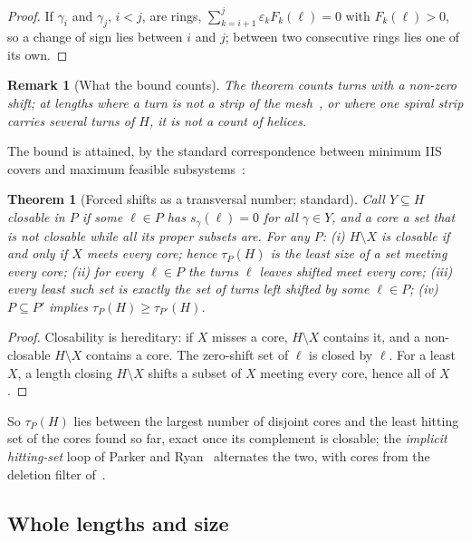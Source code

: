 \documentclass[11pt,a4paper]{article}
\newtheorem{theorem}{Theorem}
\newtheorem{remark}{Remark}
\newcommand{\shift}{s}
\begin{document}
\begin{proof}
If $\gamma_i$ and $\gamma_j$, $i < j$, are rings, $\sum_{k=i+1}^{j}
\varepsilon_k F_k(\ell) = 0$ with $F_k(\ell) > 0$, so a change of sign lies
between $i$ and $j$; between two consecutive rings lies one of its own.
\end{proof}

\begin{remark}[What the bound counts]
The theorem counts turns with a non-zero shift; at lengths where a turn is not
a strip of the mesh~\cite[Prop.~2]{gardent2026loops}, or where one spiral
strip carries several turns of $H$, it is not a count of helices.
\end{remark}

The bound is attained, by the standard correspondence between minimum IIS
covers and maximum feasible subsystems~\cite{amaldi2003maxfs,parker1996iis}:

\begin{theorem}[Forced shifts as a transversal number; standard]\label{thm:transversal}
Call $Y \subseteq H$ \emph{closable} in $P$ if some $\ell \in P$ has
$\shift_\gamma(\ell) = 0$ for all $\gamma \in Y$, and a \emph{core} a set that
is not closable while all its proper subsets are. For any $P$:
(i) $H \setminus X$ is closable if and only if $X$ meets every core; hence
$\tau_P(H)$ is the least size of a set meeting every core;
(ii) for every $\ell \in P$ the turns $\ell$ leaves shifted meet every core;
(iii) every least such set is exactly the set of turns left shifted by some
$\ell \in P$;
(iv) $P \subseteq P'$ implies $\tau_P(H) \ge \tau_{P'}(H)$.
\end{theorem}

\begin{proof}
Closability is hereditary: if $X$ misses a core, $H \setminus X$ contains it,
and a non-closable $H \setminus X$ contains a core. The zero-shift set of
$\ell$ is closed by $\ell$. For a least $X$, a length closing $H \setminus X$
shifts a subset of $X$ meeting every core, hence all of $X$.
\end{proof}

So $\tau_P(H)$ lies between the largest number of disjoint cores and the
least hitting set of the cores found so far, exact once its complement is
closable; the \emph{implicit hitting-set} loop of Parker and
Ryan~\cite{parker1996iis} alternates the two, with
cores from the deletion filter of~\cite{chinneck1991locating}.

\subsection{Whole lengths and size}\label{sec:whole}
\end{document}
